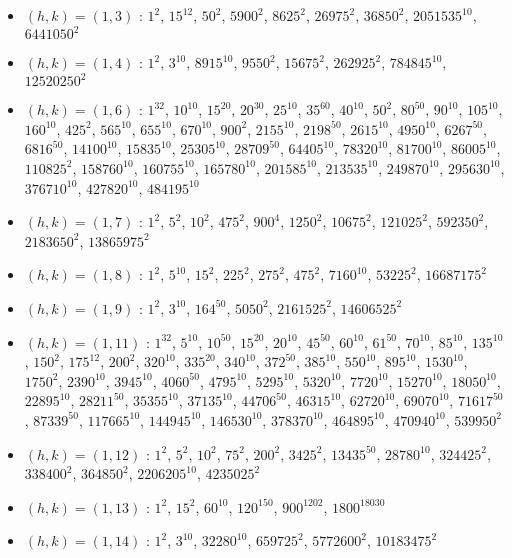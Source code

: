 \begin{itemize}
\item $(h,k)=(1,3)$ : $1^{2}$, $15^{12}$, $50^{2}$, $5900^{2}$, $8625^{2}$, $26975^{2}$, $36850^{2}$, $2051535^{10}$, $6441050^{2}$
\item $(h,k)=(1,4)$ : $1^{2}$, $3^{10}$, $8915^{10}$, $9550^{2}$, $15675^{2}$, $262925^{2}$, $784845^{10}$, $12520250^{2}$
\item $(h,k)=(1,6)$ : $1^{32}$, $10^{10}$, $15^{20}$, $20^{30}$, $25^{10}$, $35^{60}$, $40^{10}$, $50^{2}$, $80^{50}$, $90^{10}$, $105^{10}$, $160^{10}$, $425^{2}$, $565^{10}$, $655^{10}$, $670^{10}$, $900^{2}$, $2155^{10}$, $2198^{50}$, $2615^{10}$, $4950^{10}$, $6267^{50}$, $6816^{50}$, $14100^{10}$, $15835^{10}$, $25305^{10}$, $28709^{50}$, $64405^{10}$, $78320^{10}$, $81700^{10}$, $86005^{10}$, $110825^{2}$, $158760^{10}$, $160755^{10}$, $165780^{10}$, $201585^{10}$, $213535^{10}$, $249870^{10}$, $295630^{10}$, $376710^{10}$, $427820^{10}$, $484195^{10}$
\item $(h,k)=(1,7)$ : $1^{2}$, $5^{2}$, $10^{2}$, $475^{2}$, $900^{4}$, $1250^{2}$, $10675^{2}$, $121025^{2}$, $592350^{2}$, $2183650^{2}$, $13865975^{2}$
\item $(h,k)=(1,8)$ : $1^{2}$, $5^{10}$, $15^{2}$, $225^{2}$, $275^{2}$, $475^{2}$, $7160^{10}$, $53225^{2}$, $16687175^{2}$
\item $(h,k)=(1,9)$ : $1^{2}$, $3^{10}$, $164^{50}$, $5050^{2}$, $2161525^{2}$, $14606525^{2}$
\item $(h,k)=(1,11)$ : $1^{32}$, $5^{10}$, $10^{50}$, $15^{20}$, $20^{10}$, $45^{50}$, $60^{10}$, $61^{50}$, $70^{10}$, $85^{10}$, $135^{10}$, $150^{2}$, $175^{12}$, $200^{2}$, $320^{10}$, $335^{20}$, $340^{10}$, $372^{50}$, $385^{10}$, $550^{10}$, $895^{10}$, $1530^{10}$, $1750^{2}$, $2390^{10}$, $3945^{10}$, $4060^{50}$, $4795^{10}$, $5295^{10}$, $5320^{10}$, $7720^{10}$, $15270^{10}$, $18050^{10}$, $22895^{10}$, $28211^{50}$, $35355^{10}$, $37135^{10}$, $44706^{50}$, $46315^{10}$, $62720^{10}$, $69070^{10}$, $71617^{50}$, $87339^{50}$, $117665^{10}$, $144945^{10}$, $146530^{10}$, $378370^{10}$, $464895^{10}$, $470940^{10}$, $539950^{2}$
\item $(h,k)=(1,12)$ : $1^{2}$, $5^{2}$, $10^{2}$, $75^{2}$, $200^{2}$, $3425^{2}$, $13435^{50}$, $28780^{10}$, $324425^{2}$, $338400^{2}$, $364850^{2}$, $2206205^{10}$, $4235025^{2}$
\item $(h,k)=(1,13)$ : $1^{2}$, $15^{2}$, $60^{10}$, $120^{150}$, $900^{1202}$, $1800^{18030}$
\item $(h,k)=(1,14)$ : $1^{2}$, $3^{10}$, $32280^{10}$, $659725^{2}$, $5772600^{2}$, $10183475^{2}$

\end{itemize}
